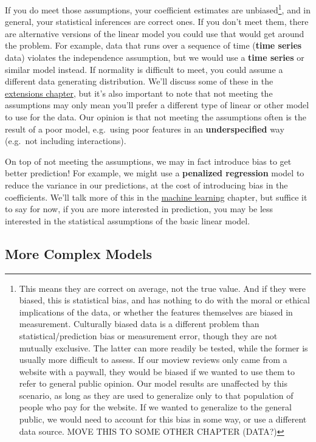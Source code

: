 \documentclass[
  letterpaper,
]{krantz}
\begin{document}
If you do meet those assumptions, your coefficient estimates are
unbiased\footnote{This means they are correct on average, not the true
  value. And if they were biased, this is statistical bias, and has
  nothing to do with the moral or ethical implications of the data, or
  whether the features themselves are biased in measurement. Culturally
  biased data is a different problem than statistical/prediction bias or
  measurement error, though they are not mutually exclusive. The latter
  can more readily be tested, while the former is usually more difficult
  to assess. If our moview reviews only came from a website with a
  paywall, they would be biased if we wanted to use them to refer to
  general public opinion. Our model results are unaffected by this
  scenario, as long as they are used to generalize only to that
  population of people who pay for the website. If we wanted to
  generalize to the general public, we would need to account for this
  bias in some way, or use a different data source. MOVE THIS TO SOME
  OTHER CHAPTER (DATA?)}, and in general, your statistical inferences
are correct ones. If you don't meet them, there are alternative versions
of the linear model you could use that would get around the problem. For
example, data that runs over a sequence of time (\textbf{time series}
data) violates the independence assumption, but we would use a
\textbf{time series} or similar model instead. If normality is difficult
to meet, you could assume a different data generating distribution.
We'll discuss some of these in the \hyperref[extensions]{extensions
chapter}, but it's also important to note that not meeting the
assumptions may only mean you'll prefer a different type of linear or
other model to use for the data. Our opinion is that not meeting the
assumptions often is the result of a poor model, e.g.~using poor
features in an \textbf{underspecified} way (e.g.~not including
interactions).

On top of not meeting the assumptions, we may in fact introduce bias to
get better prediction! For example, we might use a \textbf{penalized
regression} model to reduce the variance in our predictions, at the cost
of introducing bias in the coefficients. We'll talk more of this in the
\hyperref[machine-learning]{machine learning} chapter, but suffice it to
say for now, if you are more interested in prediction, you may be less
interested in the statistical assumptions of the basic linear model.

\subsection{More Complex Models}\label{more-complex-models}
\end{document}

